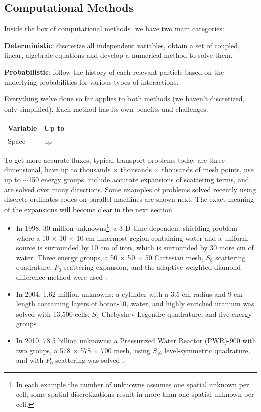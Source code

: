 \documentclass[12pt]{article}
\begin{document}
\subsection*{Computational Methods}
Inside the box of computational methods, we have two main categories: 
\begin{compactitem}
\item \textbf{Deterministic}: discretize all independent variables, obtain a set of coupled, linear, algebraic equations and develop a numerical method to solve them.
\item \textbf{Probabilistic}: follow the history of each relevant particle based on the underlying probabilities for various types of interactions.
\end{compactitem}
%
Everything we've done so far applies to both methods (we haven't discretized, only simplified). Each method has its own benefits and challenges. 

\begin{table}
\begin{center}
\begin{tabular}{| l | l |}
Variable & Up to\\
\hline
Space & up

\end{tabular}
\end{center}
\end{table}

To get more accurate fluxes, typical transport problems today are three-dimensional, have up to thousands $\times$ thousands $\times$ thousands of mesh points, use up to $\sim$150 energy groups, include accurate expansions of scattering terms, and are solved over many directions. Some examples of problems solved recently using discrete ordinates codes on parallel machines are shown next. The exact meaning of the expansions will become clear in the next section.
\begin{itemize}
  \item In 1998, 30 million unknowns\footnote{In each example the number of unknowns assumes one spatial unknown per cell; some spatial discretizations result in more than one spatial unknown per cell.}: a 3-D time dependent shielding problem where a 10 $\times$ 10 $\times$ 10 cm innermost region containing water and a uniform source is surrounded by 10 cm of iron, which is surrounded by 30 more cm of water. Three energy groups, a 50 $\times$ 50 $\times$ 50 Cartesian mesh, $S_{8}$ scattering quadrature, $P_{0}$ scattering expansion, and the adaptive weighted diamond difference method were used \cite{Alcouffe1998}.
  \item In 2004, 1.62 million unknowns: a cylinder with a 3.5 cm radius and 9 cm length containing layers of boron-10, water, and highly enriched uranium was solved with 13,500 cells, $S_{4}$ Chebyshev-Legendre quadrature, and five energy groups \cite{Warsa2004a}. 
  \item In 2010, 78.5 billion unknowns: a Pressurized Water Reactor (PWR)-900 with two groups, a 578 $\times$ 578 $\times$ 700 mesh, using $S_{16}$ level-symmetric quadrature, and with $P_{0}$ scattering was solved \cite{Davidson2010}. 
\end{itemize}
\end{document}

